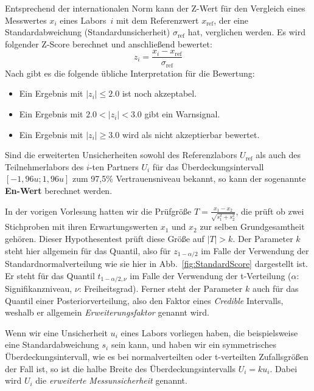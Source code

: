 Entsprechend der internationalen Norm \cite{ISO13528} kann der Z-Wert für den Vergleich eines 
Messwertes $x_{i}$ eines Labors~$i$ mit dem Referenzwert $x_\mathrm{ref}$, der eine
Standardabweichung (Standardunsicherheit) $\sigma_\mathrm{ref}$ hat, verglichen werden.
Es wird folgender Z-Score berechnet und anschließend bewertet: 
\begin{equation}
 z_i = \frac{x_{i}-x_\mathrm{ref}}{\sigma_\mathrm{ref}}
\end{equation}
Nach \cite{ISO13528} gibt es die folgende übliche Interpretation für die Bewertung: 
\begin{itemize}
	\item Ein Ergebnis mit $|z_i| \le 2.0$ ist noch akzeptabel.
	\item Ein Ergebnis mit $ 2.0 < |z_i| < 3.0$ gibt ein Warnsignal.
	\item Ein Ergebnis mit $|z_i| \ge 3.0 $ wird als nicht akzeptierbar bewertet. 
\end{itemize}
Sind die erweiterten Unsicherheiten sowohl des Referenzlabors $U_\mathrm{ref}$ als auch 
des Teilnehmerlabors des $i$-ten Partners $U_{i}$ für das %
Überdeckungsintervall $[-1,\!96 u; 1,\!96 u]$ zum 97,5\% Vertrauensniveau bekannt,
so kann der sogenannte \textbf{En-Wert} berechnet werden. 

In der vorigen Vorlesung hatten wir die Prüfgröße 
$T = \frac{x_1 - x_2}{\sqrt{s_1^2 + s_2^2}}$, die prüft ob zwei Stichproben mit ihren Erwartungswerten
$x_1$ und $x_2$ zur selben Grundgesamtheit gehören.
Dieser Hypothesentest prüft diese Größe auf $|T| > k$. Der Parameter $k$ steht hier allgemein für das Quantil,
also für $z_{1-\alpha/2}$ im Falle der Verwendung der Standardnormalverteilung wie sie hier in Abb.~\ref{fig:StandardScore}
dargestellt ist. Er steht für das Quantil $t_{1-\alpha/2,\nu}$ im Falle der Verwendung der t-Verteilung ($\alpha$: Signifikanzniveau, $\nu$:
Freiheitsgrad). Ferner steht der Parameter $k$ auch für das Quantil einer Posteriorverteilung, also den Faktor
eines \textsl{Credible} Intervalls, weshalb er allgemein \textsl{Erweiterungsfaktor} genannt wird.

Wenn wir eine Unsicherheit $u_i$ eines Labors vorliegen haben, die beispielsweise eine Standardabweichung $s_i$ sein kann, und haben wir ein symmetrisches Überdeckungsintervall, wie es bei normalverteilten oder t-verteilten Zufallsgrößen der Fall ist, so ist die halbe Breite des Überdeckungsintervalls $U_i = k u_i$. Dabei wird $U_i$ die \textsl{erweiterte Messunsicherheit} genannt.

